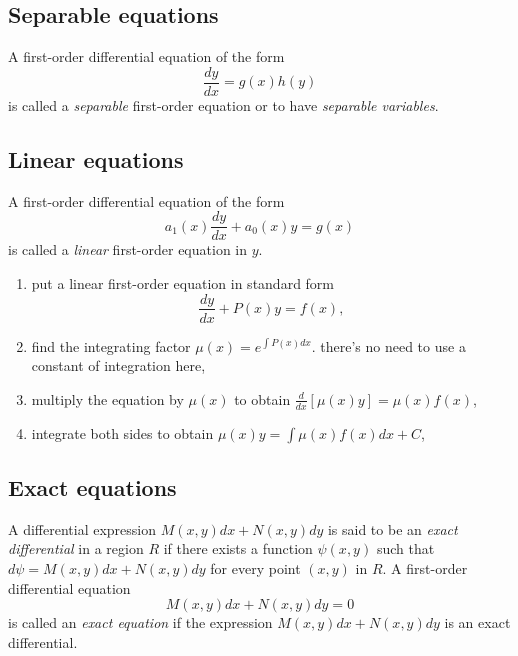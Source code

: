 \documentclass{article}
\begin{document}
\subsection{Separable equations}

\begin{defn}
    A first-order differential equation of the form
    \begin{equation}
        \frac{dy}{dx} = g(x)h(y)
    \end{equation}
    is called a \emph{separable} first-order equation or to have \emph{separable variables}.
\end{defn}

\subsection{Linear equations}

\begin{defn}
    A first-order differential equation of the form
    \begin{equation}
        a_1(x) \frac{dy}{dx} + a_0(x)y = g(x)
    \end{equation}
    is called a \emph{linear} first-order equation in \(y\).
\end{defn}

\begin{tcolorbox}[title={Solving a linear first-order equation}]
    \begin{enumerate}
        \item [(i)] put a linear first-order equation in standard form \[\frac{dy}{dx} + P(x)y = f(x),\]
        \item [(ii)] find the integrating factor \(\mu(x) = e^{\int P(x)dx}\). there's no need to use a constant of integration here,
        \item [(iii)] multiply the equation by \(\mu(x)\) to obtain \(\frac{d}{dx} \left[\mu(x)y\right] = \mu(x)f(x)\),
        \item [(iv)] integrate both sides to obtain \(\mu(x)y = \int \mu(x)f(x)dx + C\),
    \end{enumerate}
\end{tcolorbox}

\subsection{Exact equations}

\begin{defn}
    A differential expression \(M(x,y)dx + N(x,y)dy\) is said to be an \emph{exact differential} in a region \(R\) if there exists a function \(\psi(x,y)\) such that \(d\psi = M(x,y)dx + N(x,y)dy\) for every point \((x,y)\) in \(R\). A first-order differential equation
    \[
        M(x,y)dx + N(x,y)dy = 0
    \]
    is called an \emph{exact equation} if the expression \(M(x,y)dx + N(x,y)dy\) is an exact differential.
\end{defn}
\end{document}
